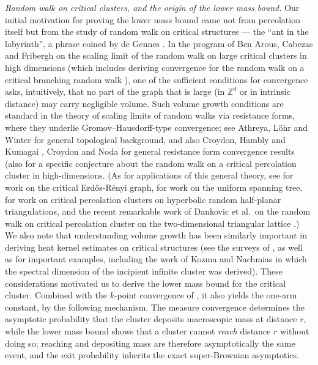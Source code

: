 \documentclass[11pt]{article}
\theoremstyle{definition}
\theoremstyle{remark}
\newcommand{\Z}{\mathbb{Z}}
\numberwithin{equation}{section}
\theoremstyle{plain}
\theoremstyle{definition}
\theoremstyle{remark}
\theoremstyle{plain}
\begin{document}
\emph{Random walk on critical clusters, and the origin of the lower mass
bound.} Our initial motivation for proving the lower mass bound came not from percolation itself but from the study of random walk on critical structures --- the ``ant in the labyrinth'', a phrase coined by de Gennes \cite{deGennes76}. In the program of Ben Arous, Cabezas and Fribergh \cite{BACF1} on the scaling limit of the random walk on large critical clusters in high dimensions (which includes deriving convergence for the random walk on a critical branching random walk \cite{BACF2}), one of the sufficient conditions for convergence asks, intuitively, that no part of the graph that is large (in $\Z^d$ or in intrinsic distance) may carry negligible volume. Such volume growth conditions are standard in the theory of scaling limits of random walks via resistance forms, where they underlie Gromov--Hausdorff-type convergence; see Athreya, L\"ohr and Winter \cite{ALW16} for general topological background, and also Croydon, Hambly and Kumagai \cite{CHK}, Croydon \cite{Cres} and Noda \cite{Noda} for general resistance form convergence results (also \cite{Cint} for a specific conjecture about the random walk on a critical percolation cluster in high-dimensions. (As for applications of this general theory, see \cite{Cer} for work on the critical Erd\H{o}s-R\'enyi graph, \cite{ACHS, BCK17} for work on the uniform spanning tree, \cite{AC} for work on critical percolation clusters on hyperbolic random half-planar triangulations, and the recent remarkable work of Dankovic et al.\ on the random walk on critical percolation cluster on the two-dimensional triangular lattice \cite{Miller}.) We also note that understanding volume growth has been similarly important in deriving heat kernel estimates on critical structures (see the surveys of \cite{Kumanom,Kumstf}, as well as \cite{BJKS,BK,HHH,KM08,KNAO} for important examples, including the work of Kozma and Nachmias in which the spectral dimension of the incipient infinite cluster was derived). These considerations motivated us to derive the lower mass bound for the critical cluster. Combined with the $k$-point convergence of \cite{CCHS26}, it also yields the one-arm constant, by the following mechanism. The measure convergence determines the asymptotic probability that the cluster deposits macroscopic mass at distance $r$, while the lower mass bound shows that a cluster cannot \emph{reach} distance $r$ without doing so; reaching and depositing mass are therefore asymptotically the same event, and the exit probability inherits the exact super-Brownian asymptotics.
\end{document}
